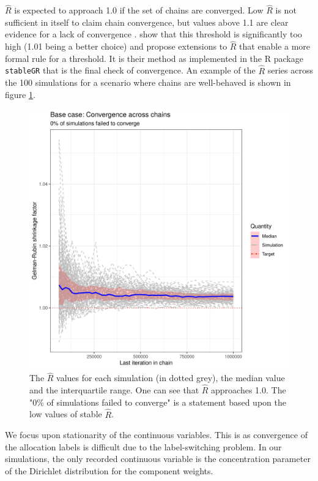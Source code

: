 \documentclass[]{article}
\begin{document}
$\hat{R}$ is expected to approach 1.0 if the set of chains are converged. Low $\hat{R}$ is not sufficient in itself to claim chain convergence, but values above 1.1 are clear evidence for a lack of convergence \citep{gelman2013bayesian}. \cite{vats2018revisiting} show that this threshold is significantly too high (1.01 being a better choice) and propose extensions to $\hat{R}$ that enable a more formal rule for a threshold. It is their method as implemented in the R package \texttt{stableGR} \citep{knudson20202stableGR} that is the final check of convergence. An example of the $\hat{R}$ series across the 100 simulations for a scenario where chains are well-behaved is shown in figure \ref{fig:simBaseCaseRhat}.

\begin{figure} %
	\centering
	\includegraphics[scale=0.65]{./Images/Simulations/Convergence/base_caseConvergenceAcrossChains.png}
	\caption{The $\hat{R}$ values for each simulation (in dotted grey), the median value and the interquartile range. One can see that $\hat{R}$ approaches 1.0. The "0\% of simulations failed to converge" is a statement based upon the low values of stable $\hat{R}$.}
	\label{fig:simBaseCaseRhat}
\end{figure}

We focus upon stationarity of the continuous variables. This is as convergence of the allocation labels is difficult due to the label-switching problem. In our simulations, the only recorded continuous variable is the concentration parameter of the Dirichlet distribution for the component weights. 
\end{document}
